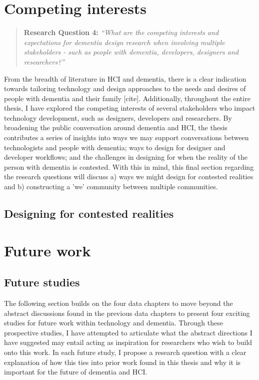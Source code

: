 \section{Competing interests}
\label{Discussion:RQ4}
\begin{quote}
\textbf{    Research Question 4:
}    
\textit{    “What are the competing interests and expectations for dementia design research when involving multiple stakeholders - such as people with dementia, developers, designers and researchers?”}
\end{quote}
From the breadth of literature in HCI and dementia, there is a clear indication towards tailoring technology and design approaches to the needs and desires of people with dementia and their family [cite]. Additionally, throughout the entire thesis, I have explored the competing interests of several stakeholders who impact technology development, such as designers, developers and researchers. By broadening the public conversation around dementia and HCI, the thesis contributes a series of insights into ways we may support conversations between technologists and people with dementia; ways to design for designer and developer workflows; and the challenges in designing for when the reality of the person with dementia is contested. With this in mind, this final section regarding the research questions will discuss a) ways we might design for contested realities and b) constructing a 'we' community between multiple communities. 

\subsection{Designing for contested realities}
\label{RQ4:ContestedRealities}

\section{Future work}
\label{FutureWork}

\subsection{Future studies}
\label{FutureStudies}
The following section builds on the four data chapters to move beyond the abstract discussions found in the previous data chapters to present four exciting studies for future work within technology and dementia. Through these prospective studies, I have attempted to articulate what the abstract directions I have suggested may entail acting as inspiration for researchers who wish to build onto this work. In each future study, I propose a research question with a clear explanation of how this ties into prior work found in this thesis and why it is important for the future of dementia and HCI.

